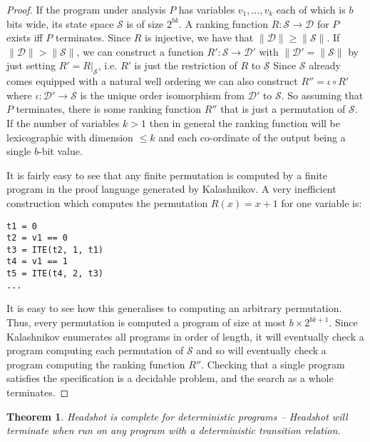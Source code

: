 \documentclass[preprint]{sigplanconf}
\newtheorem{theorem}{Theorem}
\theoremstyle{definition}
\begin{document}
\begin{proof}
 If the program under analysis $P$ has variables $v_1, \ldots, v_k$ each of which is $b$ bits wide, its state space $\mathcal{S}$ is of size $2^{bk}$.
 A ranking function $R: \mathcal{S} \to \mathcal{D}$ for $P$ exists iff $P$ terminates.  Since $R$ is injective, we have that
 $\| \mathcal{D} \| \geq \| \mathcal{S} \|$.  If $\| \mathcal{D} \| > \| \mathcal{S} \|$, we can construct a function $R': \mathcal{S} \to \mathcal{D'}$
 with $ \| \mathcal{D'} = \| \mathcal{S} \|$ by just setting $R' = R|_\mathcal{S}$, i.e. $R'$ is just the restriction of $R$ to $\mathcal{S}$
 Since $\mathcal{S}$ already comes equipped with a natural well ordering we can also construct $R'' = \iota \circ R'$
 where $\iota: \mathcal{D'} \to \mathcal{S}$ is the unique order isomorphism from $\mathcal{D'}$ to $\mathcal{S}$.
 So assuming that $P$ terminates, there is some ranking function $R''$ that is just a permutation of $\mathcal{S}$.
 If the number of variables $k > 1$ then in general the ranking function will be lexicographic with dimension $\leq k$
 and each co-ordinate of the output being a single $b$-bit value.

 It is fairly easy to see that any finite permutation is computed by a finite program in the proof language generated
 by {\sc Kalashnikov}.  A very inefficient construction which computes the permutation $R(x) = x+1$ for one variable
 is:
 \begin{verbatim}
t1 = 0
t2 = v1 == 0
t3 = ITE(t2, 1, t1)
t4 = v1 == 1
t5 = ITE(t4, 2, t3)
...
 \end{verbatim}
%
It is easy to see how this generalises to computing an arbitrary permutation.
Thus, every permutation is computed a program of size at most $b \times
2^{bk + 1}$.  Since {\sc Kalashnikov} enumerates all programs in order of
length, it will eventually check a program computing each permutation of
$\mathcal{S}$ and so will eventually check a program computing the ranking
function $R''$.  Checking that a single program satisfies the specification
is a decidable problem, and the search as a whole terminates.
%
\end{proof}

\begin{theorem}
 {\sc Headshot} is complete for deterministic programs -- {\sc Headshot} will terminate when run on
 any program with a deterministic transition relation.
\end{theorem}
\end{document}
